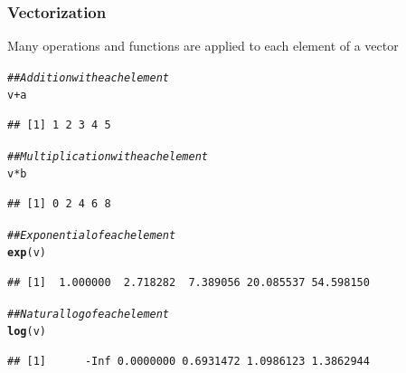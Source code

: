 \documentclass{beamer}\usepackage[]{graphicx}\usepackage[]{color}
\makeatletter
\newcommand{\hlcom}[1]{\textcolor[rgb]{0.678,0.584,0.686}{\textit{#1}}}%
\newcommand{\hlopt}[1]{\textcolor[rgb]{0,0,0}{#1}}%
\newcommand{\hlstd}[1]{\textcolor[rgb]{0.345,0.345,0.345}{#1}}%
\newcommand{\hlkwd}[1]{\textcolor[rgb]{0.737,0.353,0.396}{\textbf{#1}}}%
\newenvironment{kframe}{%
 \def\at@end@of@kframe{}%
 \ifinner\ifhmode%
  \def\at@end@of@kframe{\end{minipage}}%
  \begin{minipage}{\columnwidth}%
 \fi\fi%
 \def\FrameCommand##1{\hskip\@totalleftmargin \hskip-\fboxsep
 \colorbox{shadecolor}{##1}\hskip-\fboxsep
     \hskip-\linewidth \hskip-\@totalleftmargin \hskip\columnwidth}%
 \MakeFramed {\advance\hsize-\width
   \@totalleftmargin\z@ \linewidth\hsize
   \@setminipage}}%
 {\par\unskip\endMakeFramed%
 \at@end@of@kframe}
\newenvironment{knitrout}{}{} %
\makeatother
\begin{document}
\begin{frame}[fragile]\frametitle{Vectorization}
    Many operations and functions are applied to each element of a vector
\begin{knitrout}\footnotesize
{}\color{fgcolor}\begin{kframe}
\begin{alltt}
\hlcom{## Addition with each element}
\hlstd{v} \hlopt{+} \hlstd{a}
\end{alltt}
\begin{verbatim}
## [1] 1 2 3 4 5
\end{verbatim}
\begin{alltt}
\hlcom{## Multiplication with each element}
\hlstd{v} \hlopt{*} \hlstd{b}
\end{alltt}
\begin{verbatim}
## [1] 0 2 4 6 8
\end{verbatim}
\begin{alltt}
\hlcom{## Exponential of each element}
\hlkwd{exp}\hlstd{(v)}
\end{alltt}
\begin{verbatim}
## [1]  1.000000  2.718282  7.389056 20.085537 54.598150
\end{verbatim}
\begin{alltt}
\hlcom{## Natural log of each element}
\hlkwd{log}\hlstd{(v)}
\end{alltt}
\begin{verbatim}
## [1]      -Inf 0.0000000 0.6931472 1.0986123 1.3862944
\end{verbatim}
\end{kframe}
\end{knitrout}
\end{frame}
\end{document}
